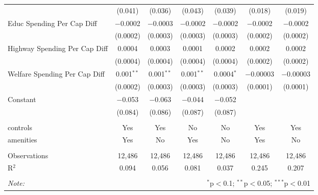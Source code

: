 \begin{table}[!htbp]
\begin{tabular}{@{\extracolsep{5pt}}lcccccc}
  & (0.041) & (0.036) & (0.043) & (0.039) & (0.018) & (0.019) \\ 
  Educ Spending Per Cap Diff & $-$0.0002 & $-$0.0003 & $-$0.0002 & $-$0.0002 & $-$0.0002 & $-$0.0002 \\ 
  & (0.0002) & (0.0003) & (0.0003) & (0.0003) & (0.0002) & (0.0002) \\ 
  Highway Spending Per Cap Diff & 0.0004 & 0.0003 & 0.0001 & 0.0002 & 0.0002 & 0.0002 \\ 
  & (0.0004) & (0.0004) & (0.0004) & (0.0004) & (0.0002) & (0.0002) \\ 
  Welfare Spending Per Cap Diff & 0.001$^{**}$ & 0.001$^{**}$ & 0.001$^{**}$ & 0.0004$^{*}$ & $-$0.00003 & $-$0.00003 \\ 
  & (0.0002) & (0.0003) & (0.0003) & (0.0003) & (0.0001) & (0.0001) \\ 
  Constant & $-$0.053 & $-$0.063 & $-$0.044 & $-$0.052 &  &  \\ 
  & (0.084) & (0.086) & (0.087) & (0.087) &  &  \\ 
 \hline \\[-1.8ex] 
controls & Yes & Yes & No & No & Yes & Yes \\ 
amenities & Yes & No & Yes & No & Yes & No \\ 
\hline \\[-1.8ex] 
Observations & 12,486 & 12,486 & 12,486 & 12,486 & 12,486 & 12,486 \\ 
R$^{2}$ & 0.094 & 0.056 & 0.081 & 0.037 & 0.245 & 0.207 \\ 
\hline 
\hline \\[-1.8ex] 
\textit{Note:}  & \multicolumn{6}{r}{$^{*}$p$<$0.1; $^{**}$p$<$0.05; $^{***}$p$<$0.01} \\ 
\end{tabular} 
\end{table} 
